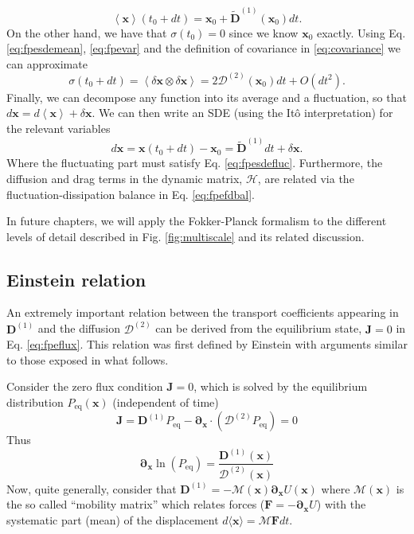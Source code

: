 \documentclass[twoside,openright,titlepage,numbers=noenddot,%
headinclude,footinclude,cleardoublepage=empty,abstract=on,
BCOR=5mm,fontsize=11pt, dvipsnames, paper=b5
]{scrreprt}
\renewcommand{\vec}[1]{\bm{#1}}
\newcommand{\tens}[1]{\bm{\mathcal{#1}}}
\begin{document}
\begin{equation}
  \label{eq:fpesdemean}
  \left\langle \vec{x}\right\rangle(t_0+dt) = \vec{x}_0 + \widetilde{\vec{D}}^{(1)}(\vec{x}_0)dt.
\end{equation}
On the other hand, we have that $\tens{\sigma}(t_0) = 0$ since we know $\vec{x}_0$ exactly. Using Eq. \eqref{eq:fpesdemean}, \eqref{eq:fpevar} and the definition of covariance in \eqref{eq:covariance} we can approximate
\begin{equation}
  \label{eq:fpesdefluc}
    \tens{\sigma}(t_0+dt) = \left\langle \delta\vec{x}\otimes\delta\vec{x}\right\rangle = 2\tens{D}^{(2)}(\vec{x}_0)dt + O(dt^2).
\end{equation}
Finally, we can decompose any function into its average and a fluctuation, so that $d\vec{x} = d\left\langle\vec{x}\right\rangle + \delta\vec{x}$. We can then write an \gls{SDE} (using the Itô interpretation\cite{Cohen2015}) for the relevant variables
\begin{equation}
  \label{eq:fpesde}
  d\vec{x} = \vec{x}(t_0 + dt) - \vec{x}_0 = \widetilde{\vec{D}}^{(1)}dt + \delta\vec{x}.
\end{equation}
Where the fluctuating part must satisfy Eq. \eqref{eq:fpesdefluc}. Furthermore, the diffusion and drag terms in the dynamic matrix, $\tens{H}$, are related via the fluctuation-dissipation balance in Eq. \eqref{eq:fpefdbal}.

In future chapters, we will apply the Fokker-Planck formalism to the different levels of detail described in Fig. \ref{fig:multiscale} and its related discussion.
\subsection{Einstein relation}\label{sec:einstein}
An extremely important relation between the transport coefficients appearing in $\vec{D}^{(1)}$ and the diffusion $\tens{D}^{(2)}$ can be derived from the equilibrium state, $\vec{J} = 0$ in Eq. \eqref{eq:fpeflux}. This relation was first defined by Einstein\cite{Einstein1905} with arguments similar to those exposed in what follows.

Consider the zero flux condition $\vec{J}=0$, which is solved by the equilibrium distribution $P_{\text{eq}}(\vec{x})$ (independent of time)
\begin{equation}
  \label{eq:fluxeq}
  \vec{J} = \vec{D}^{(1)}P_{\text{eq}} - \vec{\partial}_{\vec{x}}\cdot\left(\tens{D}^{(2)}P_{\text{eq}}\right) = 0
\end{equation}
Thus
\begin{equation}
  \label{eq:fluxeqln}
\vec{\partial}_{\vec{x}}\ln \left(P_{\text{eq}}\right) = \frac{\vec{D}^{(1)}(\vec{x})}{\tens{D}^{(2)}(\vec{x})}
\end{equation}
Now, quite generally, consider that $\vec{D}^{(1)} = -\tens{M}(\vec{x})\vec{\partial}_{\vec{x}}U(\vec{x})$ where $\tens{M}(\vec{x})$ is the so called ``mobility matrix'' which relates forces ($\vec{F} = -\vec{\partial}_{\vec{x}}U$) with the systematic part (mean) of the displacement $d\langle\vec{x}\rangle = \tens{M}\vec{F} dt$.
\end{document}
